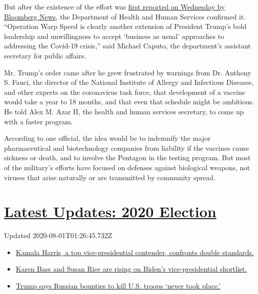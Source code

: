 But after the existence of the effort was
\href{https://www.bloomberg.com/news/articles/2020-04-29/trump-s-operation-warp-speed-aims-to-rush-coronavirus-vaccine}{first
reported on Wednesday by Bloomberg News}, the Department of Health and
Human Services confirmed it. ``Operation Warp Speed is clearly another
extension of President Trump's bold leadership and unwillingness to
accept `business as usual' approaches to addressing the Covid-19
crisis,'' said Michael Caputo, the department's assistant secretary for
public affairs.

Mr. Trump's order came after he grew frustrated by warnings from Dr.
Anthony S. Fauci, the director of the National Institute of Allergy and
Infectious Diseases, and other experts on the coronavirus task force,
that development of a vaccine would take a year to 18 months, and that
even that schedule might be ambitious. He told Alex M. Azar II, the
health and human services secretary, to come up with a faster program.

According to one official, the idea would be to indemnify the major
pharmaceutical and biotechnology companies from liability if the
vaccines cause sickness or death, and to involve the Pentagon in the
testing program. But most of the military's efforts have focused on
defenses against biological weapons, not viruses that arise naturally or
are transmitted by community spread.

\hypertarget{latest-updates-2020-election}{%
\section{\texorpdfstring{\href{https://www.nytimes3xbfgragh.onion/2020/07/31/us/elections/biden-vs-trump.html?action=click\&pgtype=Article\&state=default\&region=MAIN_CONTENT_1\&context=storylines_live_updates}{Latest
Updates: 2020
Election}}{Latest Updates: 2020 Election}}\label{latest-updates-2020-election}}

Updated 2020-08-01T01:26:45.732Z

\begin{itemize}
\tightlist
\item
  \href{https://www.nytimes3xbfgragh.onion/2020/07/31/us/elections/biden-vs-trump.html?action=click\&pgtype=Article\&state=default\&region=MAIN_CONTENT_1\&context=storylines_live_updates\#link-29fdff45}{Kamala
  Harris, a top vice-presidential contender, confronts double
  standards.}
\item
  \href{https://www.nytimes3xbfgragh.onion/2020/07/31/us/elections/biden-vs-trump.html?action=click\&pgtype=Article\&state=default\&region=MAIN_CONTENT_1\&context=storylines_live_updates\#link-13ec3d9c}{Karen
  Bass and Susan Rice are rising on Biden's vice-presidential
  shortlist.}
\item
  \href{https://www.nytimes3xbfgragh.onion/2020/07/31/us/elections/biden-vs-trump.html?action=click\&pgtype=Article\&state=default\&region=MAIN_CONTENT_1\&context=storylines_live_updates\#link-49e9a016}{Trump
  says Russian bounties to kill U.S. troops `never took place.'}
\end{itemize}

